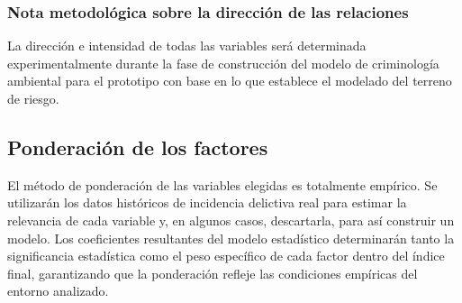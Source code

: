 \subsubsection{Nota metodológica sobre la dirección de las relaciones}

La dirección e intensidad de todas las variables será determinada experimentalmente durante la fase de construcción del modelo de criminología ambiental para el prototipo con base en lo que establece el modelado del terreno de riesgo.

\subsection{Ponderación de los factores}
El método de ponderación de las variables elegidas es totalmente empírico. Se utilizarán los datos históricos de incidencia delictiva real para estimar la relevancia de cada variable y, en algunos casos, descartarla, para así construir un modelo. Los coeficientes resultantes del modelo estadístico determinarán tanto la significancia estadística como el peso específico de cada factor dentro del índice final, garantizando que la ponderación refleje las condiciones empíricas del entorno analizado.
